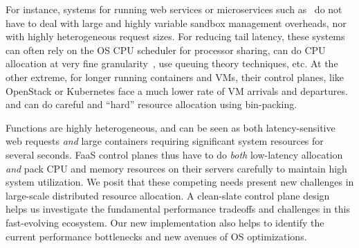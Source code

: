 For instance, systems for running web services or microservices such as~\cite{} do not have to deal with large and highly variable sandbox management overheads, nor with highly heterogeneous request sizes.
For reducing tail latency, these systems can often rely on the OS CPU scheduler for processor sharing, can do CPU allocation at very fine granularity~\cite{}, use queuing theory techniques, etc. 
At the other extreme, for longer running containers and VMs, their control planes, like OpenStack or Kubernetes face a much lower rate of VM arrivals and departures. and can do careful and ``hard'' resource allocation using bin-packing.


Functions are highly heterogeneous, and can be seen as both latency-sensitive web requests \emph{and} large containers requiring significant system resources for several seconds. 
FaaS control planes thus have to do \emph{both} low-latency allocation \emph{and} pack CPU and memory resources on their servers carefully to maintain high system utilization.
%
We posit that these competing needs present new challenges in large-scale distributed resource allocation.
A clean-slate control plane design helps us investigate the fundamental performance tradeoffs and challenges in this fast-evolving ecosystem.
Our new implementation also helps to identify the current performance bottlenecks and new avenues of OS optimizations. 





